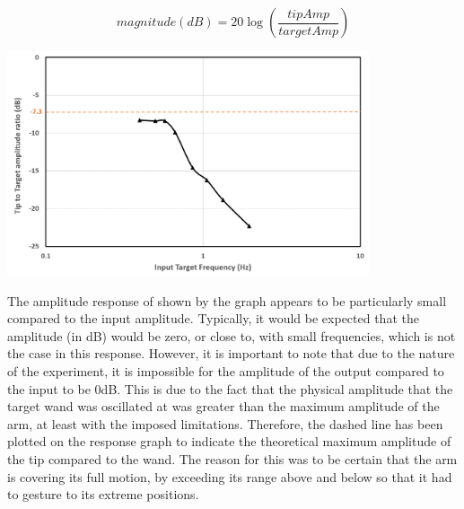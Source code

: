 \documentclass[11pt]{article}
\begin{document}
\begin{equation}
magnitude(dB) = 20\log \left(\frac{tipAmp}{targetAmp}\right)
\end{equation}


\begin{center}
\includegraphics[width=0.8\textwidth]{images/amplitudeResponse.png}
\label{figure:amplitudeResponse}
\end{center}

The amplitude response of shown by the graph appears to be particularly small compared to the input amplitude. Typically, it would be expected that the amplitude (in dB) would be zero, or close to, with small frequencies, which is not the case in this response. However, it is important to note that due to the nature of the experiment, it is impossible for the amplitude of the output compared to the input to be 0dB. This is due to the fact that the physical amplitude that the target wand was oscillated at was greater than the maximum amplitude of the arm, at least with the imposed limitations. Therefore, the dashed line has been plotted on the response graph to indicate the theoretical maximum amplitude of the tip compared to the wand. The reason for this was to be certain that the arm is covering its full motion, by exceeding its range above and below so that it had to gesture to its extreme positions.
\end{document}
